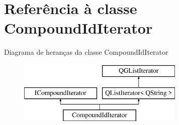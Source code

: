\hypertarget{class_compound_id_iterator}{\section{Referência à classe Compound\-Id\-Iterator}
\label{class_compound_id_iterator}
}
Diagrama de heranças da classe Compound\-Id\-Iterator\begin{figure}[H]
\begin{center}
\leavevmode
\includegraphics[height=3.000000cm]{class_compound_id_iterator}
\end{center}
\end{figure}
